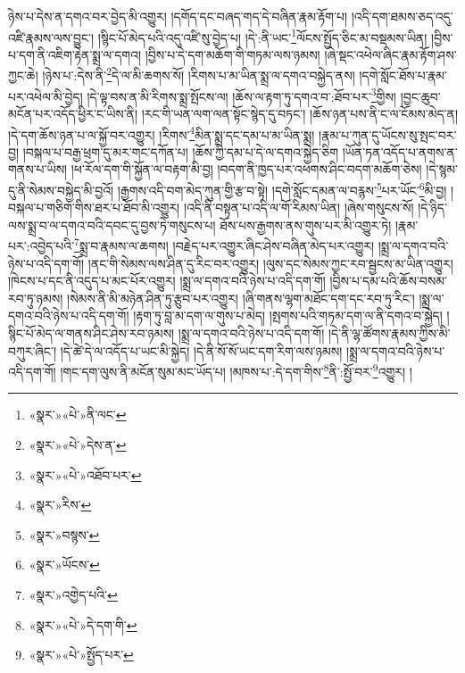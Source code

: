 ཉེས་པ་དེས་ན་དགའ་བར་བྱེད་མི་འགྱུར། །དགོད་དང་བཞད་གད་དེ་བཞིན་རྣམ་རྟོག་པ། །འདི་དག་ཐམས་ཅད་འདུ་འཛི་རྣམས་ལས་བྱུང་། །སྙིང་པོ་མེད་པའི་འདུ་འཛི་སུ་བྱེད་པ། །དེ་:ནི་ཡང་\footnote{«སྣར་»«པེ་»ནི་ལང་}ལོངས་སྤྱོད་ཅིང་མ་བསྡམས་ཡིན། །བྱིས་པ་དག་ནི་འཇིག་རྟེན་སྨྲ་ལ་དགའ། །བྱིས་པ་དེ་དག་མཆོག་གི་གཏམ་ལས་ཉམས། །ཞེ་སྡང་འཕེལ་ཞིང་རྣམ་རྟོག་ཤས་ཀྱང་ཆེ། །ཉེས་པ་:དེས་ནི་\footnote{«སྣར་»«པེ་»དེས་ན་}དེ་ལ་མི་ཆགས་སོ། །རིགས་པ་མ་ཡིན་སྨྲ་ལ་དགའ་བསྐྱེད་ནས། །དགེ་སློང་ཐོས་པ་རྣམ་པར་འཕེལ་མི་བྱེད། །དེ་ལྟ་བས་ན་མི་རིགས་སྨྲ་སྤོངས་ལ། །ཆོས་ལ་རྟག་ཏུ་དགའ་བ་:ཐོབ་པར་\footnote{«སྣར་»«པེ་»འཐོབ་པར་}གྱིས། །བྱང་ཆུབ་མངོན་པར་འདོད་ཕྱིར་ང་ཡིས་ནི། །རང་གི་ཡན་ལག་ལན་སྟོང་སྙེད་དུ་བཏང་། །ཆོས་ཉན་པས་ནི་ང་ལ་ངོམས་མེད་ན། །དེ་དག་ཆོས་ཉན་པ་ལ་སྐྱོ་བར་འགྱུར། །རིགས་\footnote{«སྣར་»རིས་}མིན་སྨྲ་དང་དམ་པ་མ་ཡིན་སྨྲ། །རྣམ་པ་ཀུན་དུ་ཡོངས་སུ་སྤང་བར་བྱ། །བསྐལ་པ་བརྒྱ་ཕྲག་དུ་མར་གང་དཀོན་པ། །ཆོས་ཀྱི་དམ་པ་དེ་ལ་དགའ་སྐྱེད་ཅིག །ཡོན་ཏན་འདོད་པ་ནགས་ན་གནས་པ་ཡིས། །ཕ་རོལ་དག་གི་སྐྱོན་ལ་བརྟག་མི་བྱ། །བདག་ནི་ཁྱད་པར་འཕགས་ཤིང་བདག་མཆོག་ཅེས། །དེ་སྙམ་དུ་ནི་སེམས་བསྐྱེད་མི་བྱའོ། །རྒྱགས་འདི་བག་མེད་ཀུན་གྱི་རྩ་བ་སྟེ། །དགེ་སློང་དམན་ལ་བརྙས་\footnote{«སྣར་»བསྙས་}པར་ཡོང་\footnote{«སྣར་»ཡོངས་}མི་བྱ། །བསྐལ་པ་གཅིག་གིས་ཐར་པ་ཐོབ་མི་འགྱུར། །འདི་ནི་བསྟན་པ་འདི་ལ་གོ་རིམས་ཡིན། །ཞེས་གསུངས་སོ། །དེ་ཉིད་ལས་སྨྲ་བ་ལ་དགའ་བའི་དབང་དུ་བྱས་ཏེ་གསུངས་པ། ཐོས་པས་རྒྱགས་ནས་གུས་པར་མི་འགྱུར་ཏེ། །རྣམ་པར་:འབྱེད་པའི་\footnote{«སྣར་»འགྱེད་པའི་}སྨྲ་བ་རྣམས་ལ་ཆགས། །བརྗེད་པར་འགྱུར་ཞིང་ཤེས་བཞིན་མེད་པར་འགྱུར། །སྨྲ་ལ་དགའ་བའི་ཉེས་པ་འདི་དག་གོ། །ནང་གི་སེམས་ལས་ཤིན་དུ་རིང་བར་འགྱུར། །ལུས་དང་སེམས་ཀྱང་རབ་སྦྱངས་མ་ཡིན་འགྱུར། །ཁེངས་པ་དང་ནི་འདུད་པ་མང་པོར་འགྱུར། །སྨྲ་ལ་དགའ་བའི་ཉེས་པ་འདི་དག་གོ། །བྱིས་པ་དམ་པའི་ཆོས་བསམ་རབ་ཏུ་ཉམས། །སེམས་ནི་མི་མཉེན་ཤིན་ཏུ་རྩུབ་པར་འགྱུར། །ཞི་གནས་ལྷག་མཐོང་དག་དང་རབ་ཏུ་རིང་། །སྨྲ་ལ་དགའ་བའི་ཉེས་པ་འདི་དག་གོ། །རྟག་ཏུ་བླ་མ་དག་ལ་གུས་པ་མེད། །སྤགས་པའི་གཏམ་དག་ལ་ནི་དགའ་བ་སྐྱེད། །སྙིང་པོ་མེད་ལ་གནས་ཤིང་ཤེས་རབ་ཉམས། །སྨྲ་ལ་དགའ་བའི་ཉེས་པ་འདི་དག་གོ། །དེ་ནི་ལྷ་ཚོགས་རྣམས་ཀྱིས་མི་བཀུར་ཞིང་། །དེ་ཚེ་དེ་ལ་འདོད་པ་ཡང་མི་སྐྱེད། །དེ་ནི་སོ་སོ་ཡང་དག་རིག་ལས་ཉམས། །སྨྲ་ལ་དགའ་བའི་ཉེས་པ་འདི་དག་གོ། །གང་དག་ལུས་ནི་མངོན་སུམ་མང་ཡོད་པ། །མཁས་པ་:དེ་དག་གིས་\footnote{«སྣར་»«པེ་»དེ་དག་གི་}ནི་:སྤྱོ་བར་\footnote{«སྣར་»«པེ་»སྤྱོད་པར་}འགྱུར། །
